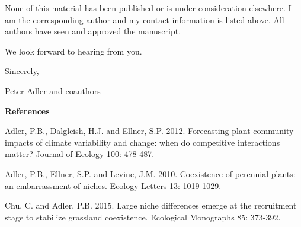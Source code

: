 \documentclass[11pt]{letter}
\begin{document}
None of this material has been published or is under consideration elsewhere. I am the corresponding author and my contact
information is listed above. All authors have seen and approved the manuscript. 

We look forward to hearing from you. 

Sincerely,

Peter Adler and coauthors

\textbf{References}

Adler, P.B., Dalgleish, H.J. and Ellner, S.P. 2012. Forecasting plant community impacts of climate variability and change: when do competitive interactions matter? Journal of Ecology 100: 478-487.

Adler, P.B., Ellner, S.P. and Levine, J.M. 2010. Coexistence of perennial plants: an embarrassment of niches. Ecology Letters 13: 1019-1029.

Chu, C. and Adler, P.B. 2015. Large niche differences emerge at the recruitment stage to stabilize grassland coexistence. Ecological Monographs 85: 373-392.
\end{document}

